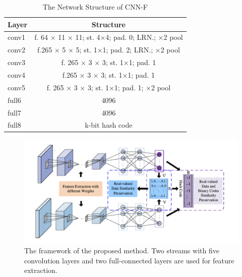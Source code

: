 \begin{table}[th]
\centering
\caption{The Network Structure of CNN-F}
\vspace{2mm}
\label{table2}
\begin{tabular}{|l|c|}
\hline
Layer & Structure                                       \\ \hline
conv1 & f. 64 × 11 × 11; st. 4×4; pad. 0; LRN.; ×2 pool \\ \hline
conv2 & f.265 × 5 × 5; st. 1×1; pad. 2; LRN.; ×2 pool   \\ \hline
conv3 & f. 265 × 3 × 3; st. 1×1; pad. 1                 \\ \hline
conv4 & f.265 × 3 × 3; st. 1×1; pad. 1                  \\ \hline
conv5 & f. 265 × 3 × 3; st. 1×1; pad. 1; ×2 pool        \\ \hline
full6 & 4096                                            \\ \hline
full7 & 4096                                            \\ \hline
full8 & k-bit hash code                                 \\ \hline
\end{tabular}
\end{table}

\begin{figure}[htbp]
\centering
\includegraphics[scale=0.6]{./Chapter3/Figures/cnnNetwork}
\caption{ The framework of the proposed method. Two streams with five convolution layers and two full-connected layers are used for feature extraction.
}\label{fig:figure3}
\end{figure} 




